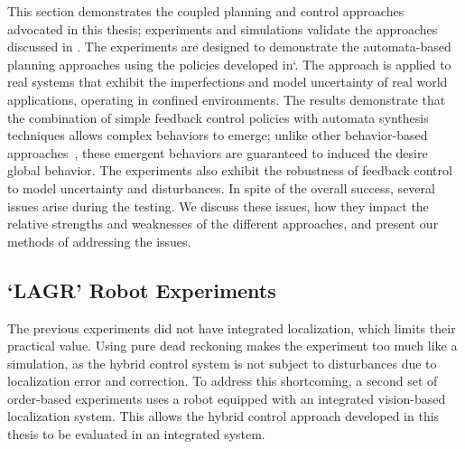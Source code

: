 
This section  demonstrates the coupled planning and control approaches
advocated in this thesis; experiments and simulations validate the
approaches discussed in .  The experiments are
designed to demonstrate the automata-based planning approaches using
the policies developed in`\cite{dcc_thesis}.  The approach is applied
to real systems that exhibit the imperfections and model uncertainty
of real world applications, operating in confined environments.  The
results demonstrate that the combination of simple feedback control
policies with automata synthesis techniques allows complex behaviors
to emerge; unlike other behavior-based approaches~\cite{brooks_86},
these emergent behaviors are guaranteed to induced the desire global
behavior.  The experiments also exhibit the robustness of feedback
control to model uncertainty and disturbances.  In spite of the
overall success, several issues arise during the testing.  We discuss
these issues, how they impact the relative strengths and weaknesses of
the different approaches, and present our methods of addressing the
issues.


\subsection{`LAGR' Robot Experiments}
\label{sec:lagr_total_order}

The previous experiments did not have integrated localization, which limits their
practical value.  Using pure dead reckoning makes the experiment too much like a
simulation, as the hybrid control system is not subject to disturbances due to
localization error and correction.  To address this shortcoming, a second set of
order-based experiments uses a robot equipped with an integrated vision-based
localization system.  This allows the hybrid control approach developed in this
thesis to be evaluated in an integrated system.

